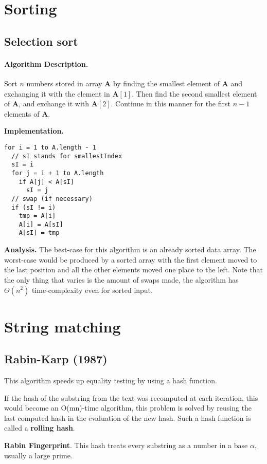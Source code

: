 \documentclass[12pt, oneside]{book}
\begin{document}
\section{Sorting}
\subsection{Selection sort}
\paragraph{Algorithm Description.} Sort \(n\) numbers stored in array
\(\mathbf{A}\) by finding the smallest element of \(\mathbf{A}\) and exchanging
it with the element in \(\mathbf{A}[1]\). Then find the second smallest element
of \(\mathbf{A}\), and exchange it with \(\mathbf{A}[2]\). Continue in this
manner for the first \(n - 1\) elements of \(\mathbf{A}\).

\textbf{Implementation.}

\begin{lstlisting}
for i = 1 to A.length - 1
  // sI stands for smallestIndex
  sI = i
  for j = i + 1 to A.length
    if A[j] < A[sI]
      sI = j
  // swap (if necessary)
  if (sI != i)
    tmp = A[i]
    A[i] = A[sI]
    A[sI] = tmp
\end{lstlisting}

\textbf{Analysis.} The best-case for this algorithm is an already sorted data
array. The worst-case would be produced by a sorted array with the first element
moved to the last position and all the other elements moved one place to the
left. Note that the only thing that varies is the amount of swaps made, the
algorithm has \(\Theta(n^2)\) time-complexity even for sorted input.

\section{String matching}
\subsection{Rabin-Karp (1987)}
This algorithm speeds up equality testing by using a hash function.

If the hash of the substring from the text was recomputed at each iteration,
this would become an O(mn)-time algorithm, this problem is solved by reusing
the last computed hash in the evaluation of the new hash. Such a hash function
is called a \textbf{rolling hash}.

\textbf{Rabin Fingerprint}. This hash treats every substring as a number in a
base \(\alpha\), usually a large prime.
\end{document}
